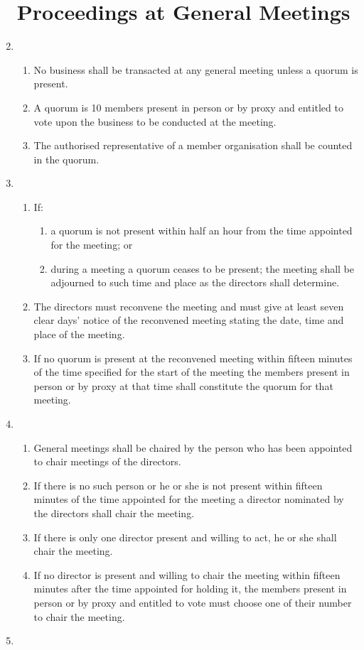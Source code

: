 \begin{enumerate}
\section{Proceedings at General Meetings}

\item
  \begin{enumerate}
  \item
    No business shall be transacted at any general meeting unless a
    quorum is present.
  \item
    A quorum is 10 members present in person or by proxy and entitled to vote upon
      the business to be conducted at the meeting.
  \item
    The authorised representative of a member organisation shall be
    counted in the quorum.
  \end{enumerate}

\item
  \begin{enumerate}
  \item
    If:
    \begin{enumerate}
    \item
      a quorum is not present within half an hour from the time appointed
      for the meeting; or
    \item
      during a meeting a quorum ceases to be present; the meeting shall
      be adjourned to such time and place as the directors shall
      determine.
    \end{enumerate}
  \item
    The directors must reconvene the meeting and must give at least
    seven clear days' notice of the reconvened meeting stating the
    date, time and place of the meeting.
  \item
    If no quorum is present at the reconvened meeting within fifteen
    minutes of the time specified for the start of the meeting the
    members present in person or by proxy at that time shall constitute
    the quorum for that meeting.
  \end{enumerate}
\item


  \begin{enumerate}
  \item
    General meetings shall be chaired by the person who has been
    appointed to chair meetings of the directors.
  \item
    If there is no such person or he or she is not present within
    fifteen minutes of the time appointed for the meeting a director
    nominated by the directors shall chair the meeting.
  \item
    If there is only one director present and willing to act, he or she
    shall chair the meeting.
  \item
    If no director is present and willing to chair the meeting within
    fifteen minutes after the time appointed for holding it, the
    members present in person or by proxy and entitled to vote must
    choose one of their number to chair the meeting.
  \end{enumerate}
\item



\end{enumerate}
